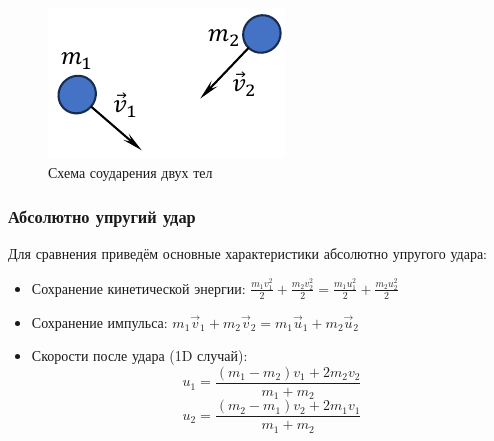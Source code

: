 \begin{figure}[H]
	\centering
	\includegraphics[width=0.5\linewidth]{image/Удар}
	\caption{Схема соударения двух тел}
	\label{fig:collision}
\end{figure}

\subsubsection{Абсолютно упругий удар}

Для сравнения приведём основные характеристики абсолютно упругого удара:

\begin{itemize}
	\item Сохранение кинетической энергии: $\frac{m_1 v_1^2}{2} + \frac{m_2 v_2^2}{2} = \frac{m_1 u_1^2}{2} + \frac{m_2 u_2^2}{2}$
	\item Сохранение импульса: $m_1\vec{v}_1 + m_2\vec{v}_2 = m_1\vec{u}_1 + m_2\vec{u}_2$
	\item Скорости после удара (1D случай):
	\[ u_1 = \frac{(m_1 - m_2)v_1 + 2m_2 v_2}{m_1 + m_2} \]
	\[ u_2 = \frac{(m_2 - m_1)v_2 + 2m_1 v_1}{m_1 + m_2} \]
\end{itemize}